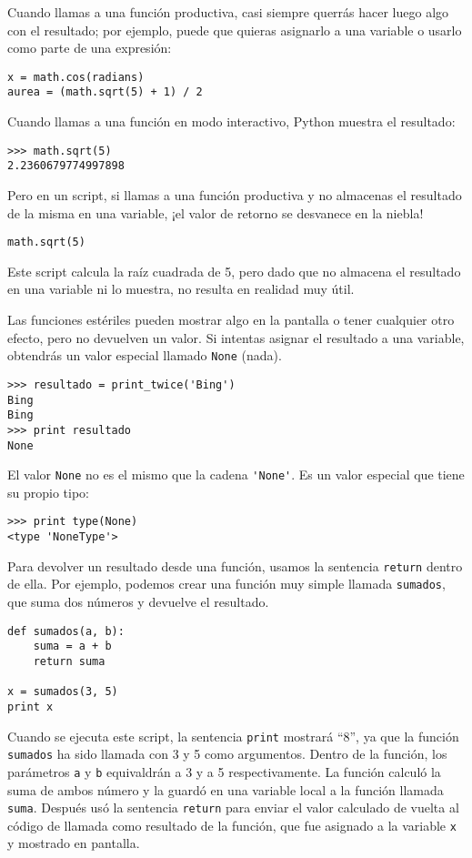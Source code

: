 Cuando llamas a una función productiva, casi siempre
querrás hacer luego algo con el resultado; por ejemplo, puede
que quieras asignarlo a una variable o usarlo como parte de una expresión:

\beforeverb
\begin{verbatim}
x = math.cos(radians)
aurea = (math.sqrt(5) + 1) / 2
\end{verbatim}
\afterverb
%
Cuando llamas a una función en modo interactivo, Python muestra
el resultado:

\beforeverb
\begin{verbatim}
>>> math.sqrt(5)
2.2360679774997898
\end{verbatim}
\afterverb
%
Pero en un script, si llamas a una función productiva y no
almacenas el resultado de la misma en una variable,
¡el valor de retorno se desvanece en la niebla!

\beforeverb
\begin{verbatim}
math.sqrt(5)
\end{verbatim}
\afterverb
%
Este script calcula la raíz cuadrada de 5, pero dado que no almacena
el resultado en una variable ni lo muestra, no resulta en realidad muy útil.


Las funciones estériles pueden mostrar algo en la pantalla o tener cualquier
otro efecto, pero no devuelven un valor. Si intentas asignar
el resultado a una variable, obtendrás un valor especial llamado
{\tt None} (nada).


\beforeverb
\begin{verbatim}
>>> resultado = print_twice('Bing')
Bing
Bing
>>> print resultado
None
\end{verbatim}
\afterverb
%
El valor {\tt None} no es el mismo que la cadena \verb"'None'".
Es un valor especial que tiene su propio tipo:

\beforeverb
\begin{verbatim}
>>> print type(None)
<type 'NoneType'>
\end{verbatim}
\afterverb
%
Para devolver un resultado desde una función, usamos la sentencia {\tt return}
dentro de ella. Por ejemplo, podemos crear una función
muy simple llamada {\tt sumados},
que suma dos números y devuelve el resultado.

\beforeverb
\begin{verbatim}
def sumados(a, b):
    suma = a + b
    return suma

x = sumados(3, 5)
print x
\end{verbatim}
\afterverb
%
Cuando se ejecuta este script, la sentencia {\tt print} mostrará ``8'',
ya que la función {\tt sumados} ha sido llamada con 3 y 5 como argumentos.
Dentro de la función, los parámetros {\tt a} y {\tt b} equivaldrán a 3 y a 5
respectivamente. La función calculó la suma de ambos número y la guardó
en una variable local a la función llamada {\tt suma}.
Después usó la sentencia {\tt return}
para enviar el valor calculado de vuelta al código de llamada
como resultado de la función, que fue asignado
a la variable {\tt x} y mostrado en pantalla.


